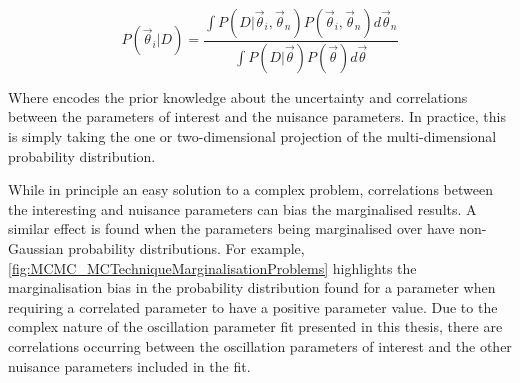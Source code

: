 \begin{equation}
P(\vec{\theta}_{i}|D) = \frac{\int P(D|\vec{\theta}_{i},\vec{\theta}_{n}) P(\vec{\theta}_{i},\vec{\theta}_{n}) d\vec{\theta}_{n}}{\int P(D|\vec{\theta}) P(\vec{\theta}) d\vec{\theta}}
\end{equation}

Where  encodes the prior knowledge about the uncertainty and correlations between the parameters of interest and the nuisance parameters. In practice, this is simply taking the one or two-dimensional projection of the multi-dimensional probability distribution.

While in principle an easy solution to a complex problem, correlations between the interesting and nuisance parameters can bias the marginalised results. A similar effect is found when the parameters being marginalised over have non-Gaussian probability distributions. For example, \autoref{fig:MCMC_MCTechniqueMarginalisationProblems} highlights the marginalisation bias in the probability distribution found for a parameter when requiring a correlated parameter to have a positive parameter value. Due to the complex nature of the oscillation parameter fit presented in this thesis, there are correlations occurring between the oscillation parameters of interest and the other nuisance parameters included in the fit.

